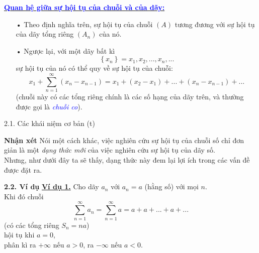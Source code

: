 \documentclass[compress,  hyperref={unicode, bookmarks=true, pdfpagemode=FullScreen}]{beamer}
\newcommand{\duong}[1]{\textcolor{blue}{#1}}
\begin{document}
\begin{frame}
\underline{\duong{\bf Quan hệ giữa sự hội tụ của chuỗi và của dãy:}}
\pause
\begin{itemize}
\item[•] Theo định nghĩa trên, sự hội tụ của chuỗi $(A)$ tương đương với sự hội tụ của dãy tổng riêng $(A_n)$ của nó.
\pause
\item[•] Ngược lại, với một dãy bất kì
\[\left\{ {{x_n}} \right\} = {x_1},{x_2},...,{x_n},...\]
\pause
sự hội tụ của nó có thể quy về sự hội tụ của chuỗi:
\[{x_1} + \sum\limits_{n = 1}^\infty  {({x_n} - {x_{n - 1}})}  = {x_1} + ({x_2} - {x_1}) + ... + ({x_n} - {x_{n - 1}}) + ...\]
\pause
(chuỗi này có các tổng riêng chính là các số hạng của dãy trên, và thường được gọi là \duong{\textit{chuỗi co}}).
\end{itemize}
\end{frame}

\begin{frame}{2.1. Các khái niệm cơ bản (t)}
\begin{block}{\bf Nhận xét}
Nói một cách khác, việc nghiên cứu sự hội tụ của chuỗi số chỉ đơn giản là một \textit{dạng thức mới} của việc nghiên cứu sự hội tụ của dãy số.\\
\medskip %
Nhưng, như dưới đây ta sẽ thấy, dạng thức này đem lại lợi ích trong các vấn đề được đặt ra.
\end{block}
\end{frame}

\begin{frame}{\bf 2.2. Ví dụ}
\pause
\underline{\bf Ví dụ 1.}
Cho dãy ${a_n}$ với ${a_n}=a$ (hằng số) với mọi $n$.\\
\pause
Khi đó chuỗi
\[\sum\limits_{n = 1}^\infty  {{a_n}} = \sum\limits_{n = 1}^\infty  {a} = a + a + ... + a +  ...\]
(có các tổng riêng $S_n=na$)\\ hội tụ khi $a=0$\pause ,\\ phân kì ra $+\infty$ nếu $a>0$\pause , ra $-\infty$ nếu $a<0$.
\end{frame}
\end{document}
